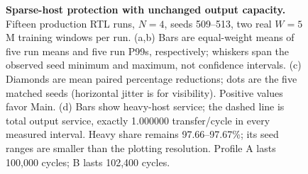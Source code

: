 \begin{figure}[t]
\caption{\textbf{Sparse-host protection with unchanged output capacity.}
Fifteen production RTL runs, $N=4$, seeds 509--513, two real $W=5$M training windows per run.
(a,b) Bars are equal-weight means of five run means and five run P99s, respectively;
whiskers span the observed seed minimum and maximum, not confidence intervals.
(c) Diamonds are mean paired percentage reductions; dots are the five matched seeds
(horizontal jitter is for visibility). Positive values favor Main.
(d) Bars show heavy-host service; the dashed line is total output service,
exactly 1.000000 transfer/cycle in every measured interval. Heavy share remains
97.66--97.67\%; its seed ranges are smaller than the plotting resolution.
Profile A lasts 100,000 cycles; B lasts 102,400 cycles.}
\label{fig:hog-sparse}
\end{figure}
